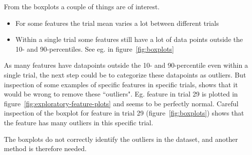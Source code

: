 From the boxplots a couple of things are of interest.
\begin{itemize}
    \item For some features the trial mean varies a lot between different trials
    \item Within a single trial some features still have a lot of data points outside the 10- and 90-percentiles. See eg.  in figure~\ref{fig:boxplots}
\end{itemize}
As many features have datapoints outside the 10- and 90-percentile even within a single trial, the next step could be to categorize these datapoints as outliers. But inspection of some examples of specific features in specific trials, shows that it would be wrong to remove these ``outliers". Eg. feature  in trial 29 is plotted in figure~\ref{fig:exploratory-feature-plots} and seems to be perfectly normal. Careful inspection of the boxplot for feature  in trial 29 (figure~\ref{fig:boxplots}) shows that the feature has many outliers in this specific trial. \par
The boxplots do not correctly identify the outliers in the dataset, and another method is therefore needed.

